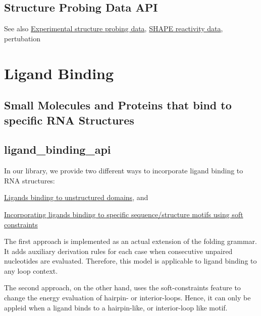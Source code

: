 \hypertarget{structure_probing_data_structure_probing_api}{}\subsection{Structure Probing Data A\+PI}\label{structure_probing_data_structure_probing_api}
\begin{DoxySeeAlso}{See also}
\hyperlink{group__probing__data}{Experimental structure probing data}, \hyperlink{group__SHAPE__reactivities}{S\+H\+A\+PE reactivity data}, pertubation
\end{DoxySeeAlso}
 \hypertarget{ligand_binding}{}\section{Ligand Binding}\label{ligand_binding}
\hypertarget{ligand_binding_ligand_binding_intro}{}\subsection{Small Molecules and Proteins that bind to specific R\+N\+A Structures}\label{ligand_binding_ligand_binding_intro}
\hypertarget{ligand_binding_ligand_binding_api}{}\subsection{ligand\+\_\+binding\+\_\+api}\label{ligand_binding_ligand_binding_api}
In our library, we provide two different ways to incorporate ligand binding to R\+NA structures\+:


\begin{DoxyItemize}
\item \hyperlink{group__ligands__up}{Ligands binding to unstructured domains}, and
\item \hyperlink{group__constraints__ligand}{Incorporating ligands binding to specific sequence/structure motifs using soft constraints}
\end{DoxyItemize}

The first approach is implemented as an actual extension of the folding grammar. It adds auxiliary derivation rules for each case when consecutive unpaired nucleotides are evaluated. Therefore, this model is applicable to ligand binding to any loop context.

The second approach, on the other hand, uses the soft-\/constraints feature to change the energy evaluation of hairpin-\/ or interior-\/loops. Hence, it can only be appleid when a ligand binds to a hairpin-\/like, or interior-\/loop like motif.

